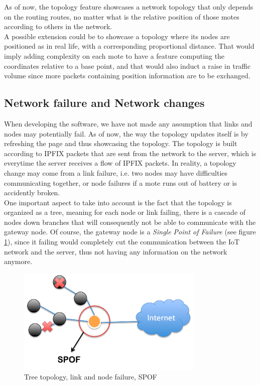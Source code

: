 As of now, the topology feature showcases a network topology that only depends on the routing routes, no matter what is the relative position of those motes according to others in the network. \\

A possible extension could be to showcase a topology where its nodes are positioned as in real life, with a corresponding proportional distance. That would imply adding complexity on each mote to have a feature computing the coordinates relative to a base point, and that would also induct a raise in traffic volume since more packets containing position information are to be exchanged.

\subsection*{Network failure and Network changes}

When developing the software, we have not made any assumption that links and nodes may potentially fail. As of now, the way the topology updates itself is by refreshing the page and thus showcasing the topology. The topology is built according to IPFIX packets that are sent from the network to the server, which is everytime the server receives a flow of IPFIX packets. In reality, a topology change may come from a link failure, i.e. two nodes may have difficulties communicating together, or node failures if a mote runs out of battery or is accidently broken. \\

One important aspect to take into account is the fact that the topology is organized as a tree, meaning for each node or link failing, there is a cascade of nodes down branches that will consequently not be able to communicate with the gateway node. Of course, the gateway node is a \textit{Single Point of Failure} (see figure \ref{fig:spof}), since it failing would completely cut the communication between the IoT network and the server, thus not having any information on the network anymore.\\

\begin{figure}[!h]
	\centering
	\includegraphics[width=0.8\textwidth]{res/spof.png}
	\caption{Tree topology, link and node failure, SPOF}
	\label{fig:spof}
\end{figure}

